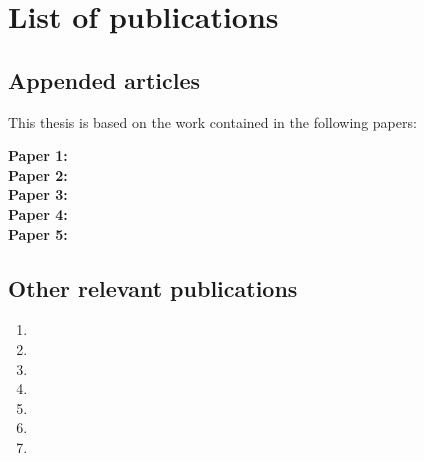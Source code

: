 
\nobibliography*

\clearpage

\chapter*{List of publications}

\section*{Appended articles}

This thesis is based on the work contained in the following papers:

\begin{description}
\item[\textbf{Paper 1:}] 
\item[\textbf{Paper 2:}] 
\item[\textbf{Paper 3:}] 
\item[\textbf{Paper 4:}] 
\item[\textbf{Paper 5:}] 
\end{description}

\section*{Other relevant publications}

\begin{enumerate}
\item {}
\item {}
\item {}
\item {}
\item {}
\item {}
\item {}
\end{enumerate}
